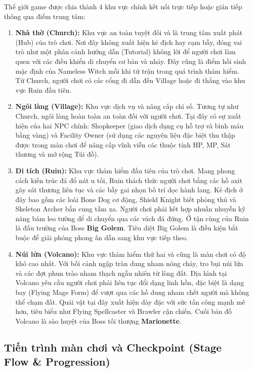 \documentclass[../DoAn.tex]{subfiles}
\begin{document}
Thế giới game được chia thành 4 khu vực chính kết nối trực tiếp hoặc gián tiếp thông qua điểm trung tâm:
\begin{enumerate}
    \item \textbf{Nhà thờ (Church):} Khu vực an toàn tuyệt đối và là trung tâm xuất phát (Hub) của trò chơi. Nơi đây không xuất hiện kẻ địch hay cạm bẫy, đóng vai trò như một phân cảnh hướng dẫn (Tutorial) không lời để người chơi làm quen với các điều khiển di chuyển cơ bản và nhảy. Đây cũng là điểm hồi sinh mặc định của Nameless Witch mỗi khi tử trận trong quá trình thám hiểm. Từ Church, người chơi có các cổng đi dẫn đến Village hoặc đi thẳng vào khu vực Ruin đầu tiên.
    \item \textbf{Ngôi làng (Village):} Khu vực dịch vụ và nâng cấp chỉ số. Tương tự như Church, ngôi làng hoàn toàn an toàn đối với người chơi. Tại đây có sự xuất hiện của hai NPC chính: Shopkeeper (giao dịch dụng cụ hỗ trợ và bình máu bằng vàng) và Facility Owner (sử dụng các nguyên liệu đặc biệt thu thập được trong màn chơi để nâng cấp vĩnh viễn các thuộc tính HP, MP, Sát thương và mở rộng Túi đồ).
    \item \textbf{Di tích (Ruin):} Khu vực thám hiểm đầu tiên của trò chơi. Mang phong cách kiến trúc đá đổ nát u tối, Ruin thách thức người chơi bằng các hồ axit gây sát thương liên tục và các bẫy gai nhọn bố trí dọc hành lang. Kẻ địch ở đây bao gồm các loài Bone Dog cơ động, Shield Knight biết phòng thủ và Skeleton Archer bắn cung tầm xa. Người chơi phải kết hợp nhuần nhuyễn kỹ năng bám leo tường để di chuyển qua các vách đá đứng. Ở tận cùng của Ruin là đấu trường của Boss \textbf{Big Golem}. Tiêu diệt Big Golem là điều kiện bắt buộc để giải phóng phong ấn dẫn sang khu vực tiếp theo.
    \item \textbf{Núi lửa (Volcano):} Khu vực thám hiểm thứ hai và cũng là màn chơi có độ khó cao nhất. Với bối cảnh ngập tràn dung nham nóng chảy, tro bụi núi lửa và các đợt phun trào nham thạch ngẫu nhiên từ lòng đất. Địa hình tại Volcano yêu cầu người chơi phải liên tục đổi dạng linh hồn, đặc biệt là dạng bay (Flying Mage Form) để vượt qua các hồ dung nham chết người mà không thể chạm đất. Quái vật tại đây xuất hiện dày đặc với sức tấn công mạnh mẽ hơn, tiêu biểu như Flying Spellcaster và Brawler cận chiến. Cuối bản đồ Volcano là sào huyệt của Boss tối thượng \textbf{Marionette}.
\end{enumerate}

\subsection{Tiến trình màn chơi và Checkpoint (Stage Flow \& Progression)}
\label{subsection:3.8.3}
\end{document}
